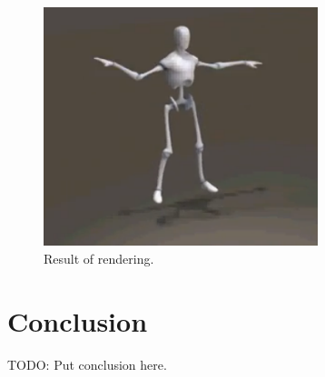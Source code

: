 \documentclass[a4paper]{article}
\begin{document}
\begin{figure}
	\centering
	\includegraphics[width=8cm]{3dRender.PNG}
	\caption{Result of rendering.}
	\label{fig:3drender}
\end{figure}

\section{Conclusion}

TODO: Put conclusion here.

\newpage

\end{document}
